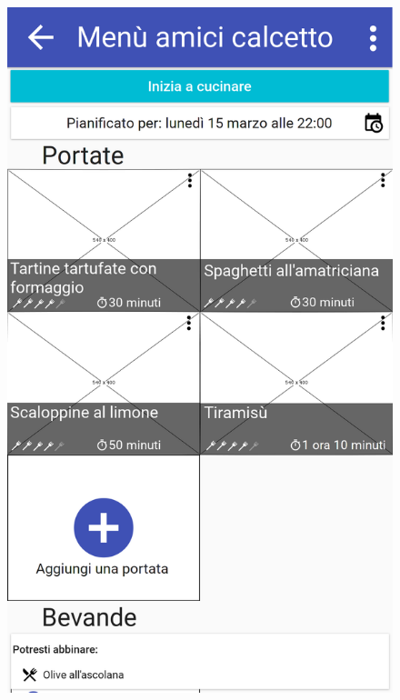 \begin{figure}[H]
	\begin{minipage}{.49\textwidth}
		\includegraphics[width=\textwidth]{img/wireframe/men_amici_calcetto_menu_contestuale_piatto.png}
	\end{minipage}
	\begin{minipage}{.49\textwidth}

\end{minipage}
\end{figure}
